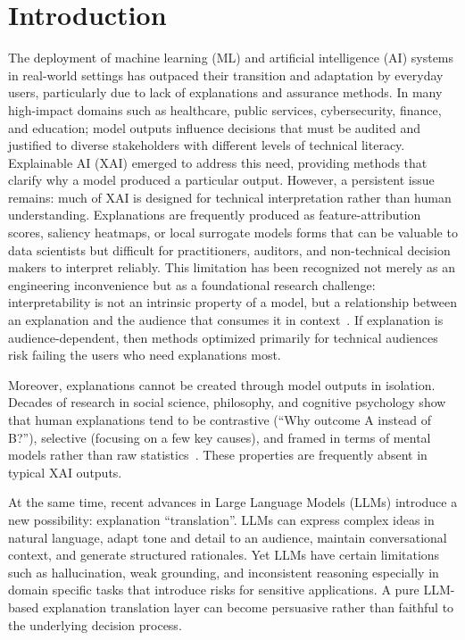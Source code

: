 \documentclass[lnbip]{svmultln}
\begin{document}
\section{Introduction}
The deployment of machine learning (ML) and artificial intelligence (AI) systems in real-world settings has outpaced their transition and adaptation by everyday users, particularly due to lack of explanations and assurance methods. In many high-impact domains such as healthcare, public services, cybersecurity, finance, and education; model outputs influence decisions that must be audited and justified to diverse stakeholders with different levels of technical literacy. Explainable AI (XAI) emerged to address this need, providing methods that clarify why a model produced a particular output. However, a persistent issue remains: much of XAI is designed for technical interpretation rather than human understanding. Explanations are frequently produced as feature-attribution scores, saliency heatmaps, or local surrogate models forms that can be valuable to data scientists but difficult for practitioners, auditors, and non-technical decision makers to interpret reliably.
This limitation has been recognized not merely as an engineering inconvenience but as a foundational research challenge: interpretability is not an intrinsic property of a model, but a relationship between an explanation and the audience that consumes it in context~\cite{doshi2017}. If explanation is audience-dependent, then methods optimized primarily for technical audiences risk failing the users who need explanations most. 

Moreover, explanations cannot be created through model outputs in isolation. Decades of research in social science, philosophy, and cognitive psychology show that human explanations tend to be contrastive (``Why outcome A instead of B?''), selective (focusing on a few key causes), and framed in terms of mental models rather than raw statistics~\cite{miller2019}. These properties are frequently absent in typical XAI outputs.

At the same time, recent advances in Large Language Models (LLMs) introduce a new possibility: explanation ``translation''. LLMs can express complex ideas in natural language, adapt tone and detail to an audience, maintain conversational context, and generate structured rationales. Yet LLMs have certain limitations such as hallucination, weak grounding, and inconsistent reasoning especially in domain specific tasks that introduce risks for sensitive applications. A pure LLM-based explanation translation layer can become persuasive rather than faithful to the underlying decision process.
\end{document}
